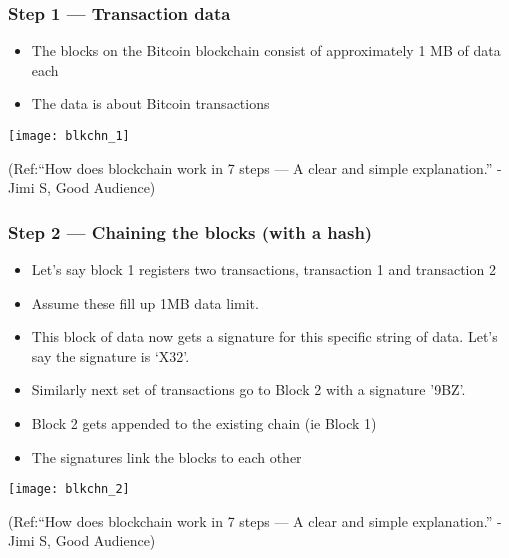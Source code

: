 \begin{frame}[fragile]\frametitle{Step 1 — Transaction data}
\begin{itemize}
\item The blocks on the Bitcoin blockchain consist of approximately 1 MB of data each
\item The data is about Bitcoin transactions
\end{itemize}

\begin{center}
\texttt{[image: blkchn\_1]}

{\tiny (Ref:``How does blockchain work in 7 steps — A clear and simple explanation.'' - Jimi S, Good Audience)}
\end{center}

\end{frame}

\begin{frame}[fragile]\frametitle{Step 2 — Chaining the blocks (with a hash)}
\begin{itemize}
\item Let’s say block 1 registers two transactions, transaction 1 and transaction 2
\item Assume these fill up 1MB data limit.
\item This block of data now gets a signature for this specific string of data. Let’s say the signature is ‘X32’.
\item Similarly next set of transactions go to Block 2 with a signature '9BZ'.
\item Block 2 gets appended to the existing chain (ie Block 1) 
\item The signatures link the blocks to each other
\end{itemize}

\begin{center}
\texttt{[image: blkchn\_2]}

{\tiny (Ref:``How does blockchain work in 7 steps — A clear and simple explanation.'' - Jimi S, Good Audience)}
\end{center}

\end{frame}

